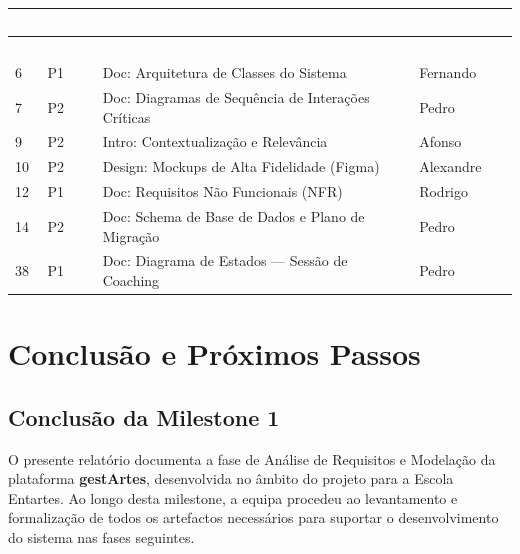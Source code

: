 \documentclass[12pt,a4paper]{report}
\begin{document}
\begin{longtable}{@{}p{} | p{} | p{} | p{}@{}}
\toprule
\rowcolor{headerblue}
\textbf{\textcolor{white}{ID}} & \textbf{\textcolor{white}{Prior.}} & \textbf{\textcolor{white}{Tarefa}} & \textbf{\textcolor{white}{Responsável}} \\ \midrule
\endfirsthead

\toprule
\rowcolor{headerblue}
\textbf{\textcolor{white}{ID}} & \textbf{\textcolor{white}{Prior.}} & \textbf{\textcolor{white}{Tarefa}} & \textbf{\textcolor{white}{Responsável}} \\ \midrule
\endhead

6  & P1 & Doc: Arquitetura de Classes do Sistema                & Fernando  \\ \midrule
7  & P2 & Doc: Diagramas de Sequência de Interações Críticas    & Pedro     \\ \midrule
9  & P2 & Intro: Contextualização e Relevância                  & Afonso    \\ \midrule
10 & P2 & Design: Mockups de Alta Fidelidade (Figma)            & Alexandre \\ \midrule
12 & P1 & Doc: Requisitos Não Funcionais (NFR)                  & Rodrigo   \\ \midrule
14 & P2 & Doc: Schema de Base de Dados e Plano de Migração      & Pedro     \\ \midrule
38 & P1 & Doc: Diagrama de Estados — Sessão de Coaching         & Pedro     \\ \bottomrule
\end{longtable}

\chapter{Conclusão e Próximos Passos}

\section{Conclusão da Milestone 1}

O presente relatório documenta a fase de Análise de Requisitos e Modelação da plataforma \textbf{gestArtes}, desenvolvida no âmbito do projeto para a Escola Entartes. Ao longo desta milestone, a equipa procedeu ao levantamento e formalização de todos os artefactos necessários para suportar o desenvolvimento do sistema nas fases seguintes.
\end{document}
